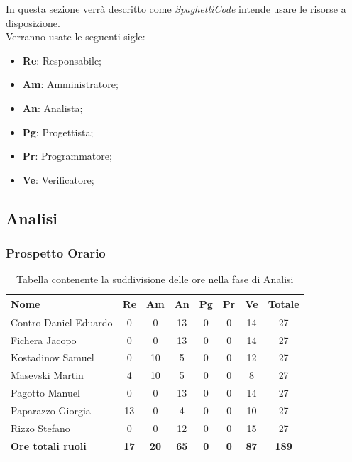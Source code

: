 \documentclass[../piano_di_progetto.tex]{subfiles}
\begin{document}
In questa sezione verrà descritto come \emph{SpaghettiCode} intende usare le risorse a disposizione. \\
Verranno usate le seguenti sigle:\par
\begin{itemize}
\item \textbf{Re}: Responsabile;
\item \textbf{Am}: Amministratore;
\item \textbf{An}: Analista;
\item \textbf{Pg}: Progettista;
\item \textbf{Pr}: Programmatore;
\item \textbf{Ve}: Verificatore;
\end{itemize}


\subsection{Analisi}%
\label{sub:fase_analisi}
\subsubsection{Prospetto Orario}


\begin{table}[!ht]
	\centering
	\begin{tabular}{|l|c|c|c|c|c|c|c|}
	\hline
	\rowcolor{lightgray}
	\textbf{Nome} & \textbf{Re} & \textbf{Am} & \textbf{An} & \textbf{Pg}  & \textbf{Pr}   & \textbf{Ve} & \textbf{Totale}\\
	\hline
		Contro Daniel Eduardo & 0 & 0 & 13 & 0 & 0 & 14 & 27 \\
		Fichera Jacopo & 0 & 0 & 13 & 0 & 0 & 14 & 27 \\
		Kostadinov Samuel & 0 & 10 & 5 & 0 & 0 & 12 & 27 \\			
		Masevski Martin & 4 & 10 & 5 & 0 & 0 & 8 & 27 \\
		Pagotto Manuel & 0 & 0 & 13 & 0 & 0 & 14 & 27 \\			
		Paparazzo Giorgia & 13 & 0 & 4 & 0 & 0 & 10 & 27 \\
		Rizzo Stefano & 0 & 0 & 12 & 0 & 0 & 15 & 27 \\
		\hline
		\textbf{Ore totali ruoli} & \textbf{17} & \textbf{20} & \textbf{65} & \textbf{0} & \textbf{0} & \textbf{87} & \textbf{189} \\
	\hline	
	\end{tabular}
	\caption{Tabella contenente la suddivisione delle ore nella fase di Analisi}
\end{table}
\end{document}
